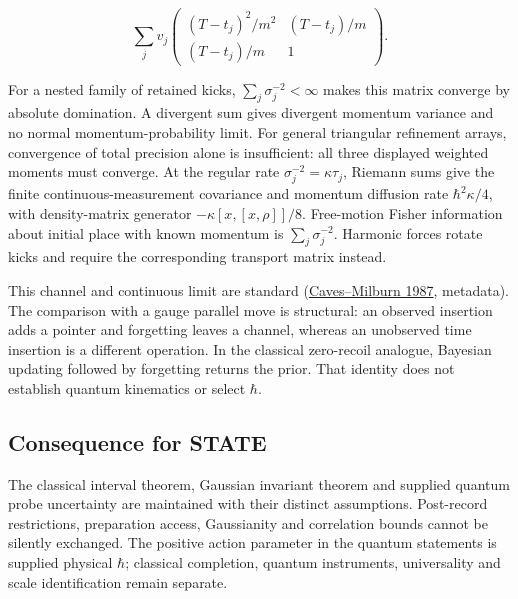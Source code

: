 \documentclass[11pt,a4paper]{article}
\begin{document}
\[\sum_jv_j\begin{pmatrix}(T-t_j)^2/m^2&(T-t_j)/m\\
(T-t_j)/m&1\end{pmatrix}.\]

For a nested family of retained kicks, \(\sum_j\sigma_j^{-2}<\infty\)
makes this matrix converge by absolute domination. A divergent sum gives
divergent momentum variance and no normal momentum-probability limit.
For general triangular refinement arrays, convergence of total precision
alone is insufficient: all three displayed weighted moments must
converge. At the regular rate \(\sigma_j^{-2}=\kappa\tau_j\), Riemann
sums give the finite continuous-measurement covariance and momentum
diffusion rate \(\hbar^2\kappa/4\), with density-matrix generator
\(-\kappa[x,[x,\rho]]/8\). Free-motion Fisher information about initial
place with known momentum is \(\sum_j\sigma_j^{-2}\). Harmonic forces
rotate kicks and require the corresponding transport matrix instead.

This channel and continuous limit are standard
(\href{https://doi.org/10.1103/PhysRevA.36.5543}{Caves--Milburn 1987},
metadata). The comparison with a gauge parallel move is structural: an
observed insertion adds a pointer and forgetting leaves a channel,
whereas an unobserved time insertion is a different operation. In the
classical zero-recoil analogue, Bayesian updating followed by forgetting
returns the prior. That identity does not establish quantum kinematics
or select \(\hbar\).

\hypertarget{consequence-for-state}{%
\subsection{Consequence for STATE}\label{consequence-for-state}}

The classical interval theorem, Gaussian invariant theorem and supplied
quantum probe uncertainty are maintained with their distinct
assumptions. Post-record restrictions, preparation access, Gaussianity
and correlation bounds cannot be silently exchanged. The positive action
parameter in the quantum statements is supplied physical \(\hbar\);
classical completion, quantum instruments, universality and scale
identification remain separate.
\end{document}
